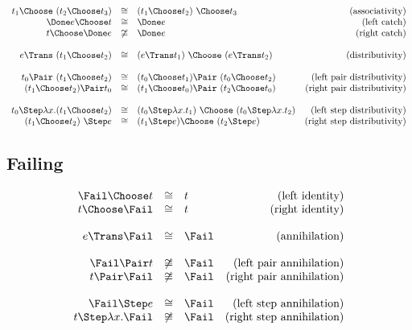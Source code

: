 \begin{equation*}
  \begin{array}{rclr}
    t_1 \Choose\ (t_2 \Choose t_3)
      &\cong& (t_1 \Choose t_2)\ \Choose t_3
      & \text{(associativity)} \\
    \Done e \Choose t
      &\cong& \Done e
      & \text{(left catch)} \\
    t \Choose \Done e
      &\not\cong& \Done e
      & \text{(right catch)} \\
    & & & \\
    e \Trans\ (t_1 \Choose t_2)
      &\cong& (e \Trans t_1)\ \Choose\ (e \Trans t_2)
      & \text{(distributivity)} \\
    & & & \\
    t_0 \Pair\ (t_1 \Choose t_2)
      &\cong& (t_0 \Choose t_1) \Pair\ (t_0 \Choose t_2)
      & \text{(left pair distributivity)} \\
    (t_1 \Choose t_2) \Pair t_0
      &\cong& (t_1 \Choose t_0) \Pair\ (t_2 \Choose t_0)
      & \text{(right pair distributivity)} \\
    & & & \\
    t_0 \Step \lambda x. (t_1 \Choose t_2)
      &\cong& (t_0 \Step \lambda x. t_1)\ \Choose\ (t_0 \Step \lambda x. t_2)
      & \text{(left step distributivity)} \\
    (t_1 \Choose t_2)\ \Step e
      &\cong& (t_1 \Step e) \Choose\ (t_2 \Step e)
      & \text{(right step distributivity)} \\
  \end{array}
\end{equation*}

\subsection{Failing}

\begin{equation*}
  \begin{array}{rclr}
    \Fail \Choose t
      &\cong& t
      & \text{(left identity)} \\
    t \Choose \Fail
      &\cong& t
      & \text{(right identity)} \\
    & & & \\
    e \Trans \Fail
      &\cong& \Fail
      & \text{(annihilation)} \\
    & & & \\
    \Fail \Pair t
      &\not\cong& \Fail
      & \text{(left pair annihilation)} \\
    t \Pair \Fail
      &\not\cong& \Fail
      & \text{(right pair annihilation)} \\
    & & & \\
    \Fail \Step e
      &\cong& \Fail
      & \text{(left step annihilation)} \\
    t \Step \lambda x. \Fail
      &\not\cong& \Fail
      & \text{(right step annihilation)} \\
  \end{array}
\end{equation*}


